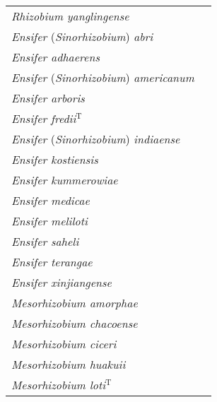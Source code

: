 {\begin{longtable}{ll}
    \emph{Rhizobium yanglingense}                   & \citealp{Tan01a}                       \\
    \cmidrule{1-2}
    \emph{Ensifer} (\emph{Sinorhizobium}) \emph{abri}                       & \citealp{Ogasawara03} \\
    \emph{Ensifer adhaerens}                  & \citep{Wang02a} \citealp{Young03b}\\
    \emph{Ensifer} (\emph{Sinorhizobium}) \emph{americanum}                 & \citealp{Toledo03}                        \\
    \emph{Ensifer arboris}                    & \citep{Nick99} \citealp{Young03b}                         \\
    \emph{Ensifer fredii}$^{\mathrm{T}}$      & \citep{Scholla84} \citealp{Young03b}      \\
    \emph{Ensifer} (\emph{Sinorhizobium}) \emph{indiaense}                  & \citealp{Ogasawara03} \\
    \emph{Ensifer kostiensis}                  & \citep{Nick99}  \citealp{Young03b}                        \\
    \emph{Ensifer kummerowiae}                & \citep{Wei02} \citealp{Young03b}                          \\
    \emph{Ensifer medicae}                    & \citep{Rome96}  \citealp{Young03b}                        \\
    \emph{Ensifer meliloti}                   & \citep{Dangeard26} \citealp{Young03b}     \\
    \emph{Ensifer saheli}                     & \citep{deLajudie94}  \citealp{Young03b}                   \\
    \emph{Ensifer terangae}                   & \citep{deLajudie94} \citealp{Young03b}                    \\
    \emph{Ensifer xinjiangense}               & \citep{Chen88}  \citealp{Young03b}                        \\
    \cmidrule{1-2}
    \emph{Mesorhizobium amorphae}               & \citealp{Wang99a}                     \\
    \emph{Mesorhizobium chacoense}              & \citealp{Velazquez01a}                \\
    \emph{Mesorhizobium ciceri}                 & \citep{Nour94a} \citealp{Jarvis97}    \\
    \emph{Mesorhizobium huakuii}                & \citep{Chen91} \citealp{Jarvis97}     \\
    \emph{Mesorhizobium loti}$^{\mathrm{T}}$    & \citep{Jarvis82} \citealp{Jarvis97}   \\

\end{longtable}}
